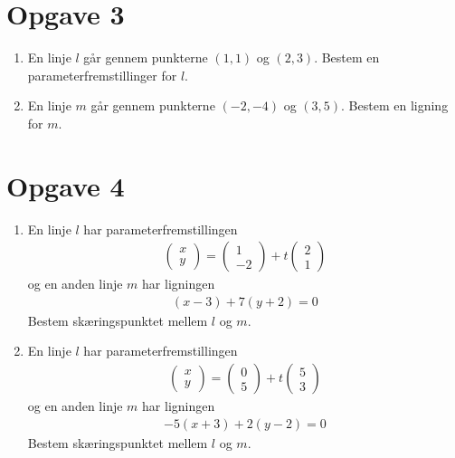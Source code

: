 \section*{Opgave 3}
\begin{enumerate}[label=\roman*)]
	\item En linje $l$ går gennem punkterne $(1,1)$ og $(2,3)$. Bestem en parameterfremstillinger for 
	$l$. 
	\item En linje $m$ går gennem punkterne $(-2,-4)$ og $(3,5)$. Bestem en ligning for $m$. 
\end{enumerate}

\section*{Opgave 4}
\begin{enumerate}[label=\roman*)]
	\item En linje $l$ har parameterfremstillingen 
	\begin{align*}
		\begin{pmatrix}
			x \\ y
		\end{pmatrix} = 
		\begin{pmatrix}
			1 \\ -2
		\end{pmatrix} + t
		\begin{pmatrix}
			2 \\ 1
		\end{pmatrix}
	\end{align*}
	og en anden linje $m$ har ligningen
	\begin{align*}
		(x-3) + 7(y+2) = 0
	\end{align*}
	Bestem skæringspunktet mellem $l$ og $m$. 
	\item En linje $l$ har parameterfremstillingen 
	\begin{align*}
		\begin{pmatrix}
			x \\ y
		\end{pmatrix} = 
		\begin{pmatrix}
			0 \\ 5
		\end{pmatrix} + t
		\begin{pmatrix}
			5 \\ 3
		\end{pmatrix}
	\end{align*}
	og en anden linje $m$ har ligningen
	\begin{align*}
		-5(x+3) + 2(y-2) = 0
	\end{align*}
	Bestem skæringspunktet mellem $l$ og $m$. 
\end{enumerate}
